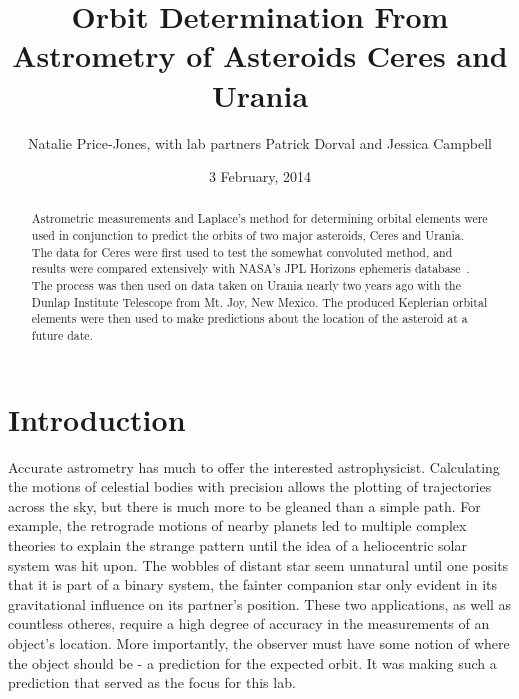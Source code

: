\documentclass[a4paper,12pt]{article}
\begin{document}
\onehalfspacing
\title{Orbit Determination From Astrometry of Asteroids Ceres and Urania}
\author{Natalie Price-Jones, with lab partners Patrick Dorval and Jessica Campbell}
\date{3 February, 2014}
\maketitle


\begin{abstract}
\label{abstract}

Astrometric measurements and Laplace's method for determining orbital elements were used in conjunction to predict the orbits of two major asteroids, Ceres and Urania. The data for Ceres were first used to test the somewhat convoluted method, and results were compared extensively with NASA's JPL Horizons ephemeris database~\citep{urania}. The process was then used on data taken on Urania nearly two years ago with the Dunlap Institute Telescope from Mt. Joy, New Mexico. The produced Keplerian orbital elements were then used to make predictions about the location of the asteroid at a future date.

\end{abstract}


\section{Introduction}
\label{sec:intro}

Accurate astrometry has much to offer the interested astrophysicist. Calculating the motions of celestial bodies with precision allows the plotting of trajectories across the sky, but there is much more to be gleaned than a simple path. For example, the retrograde motions of nearby planets led to multiple complex theories to explain the strange pattern until the idea of a heliocentric solar system was hit upon. The wobbles of distant star seem unnatural until one posits that it is part of a binary system, the fainter companion star only evident in its gravitational influence on its partner's position. These two applications, as well as countless otheres, require a high degree of accuracy in the measurements of an object's location. More importantly, the observer must have some notion of where the object should be - a prediction for the expected orbit. It was making such a prediction that served as the focus for this lab. 
\end{document}
